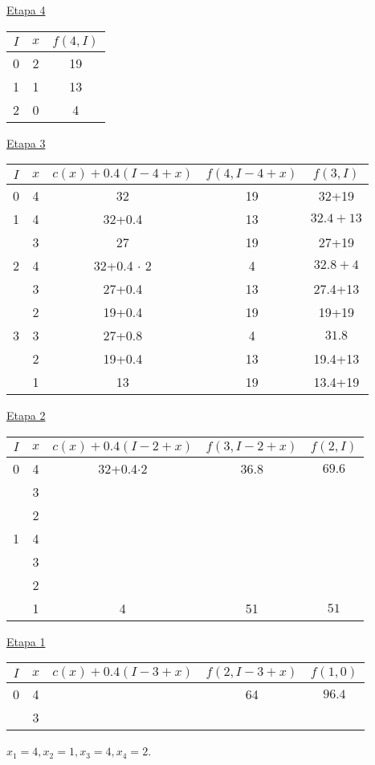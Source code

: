 \documentclass[twoside]{article}
\begin{document}
\begin{ejercicio}{3}
\begin{solucion}
\underline{Etapa 4}

\begin{tabular}{|c| c| c|}
\hline
$I$ & $x$ & $f(4,I)$\\
\hline
0 & 2 & 19\\
\hline
1 & 1 & 13\\
\hline
2 & 0 & 4\\
\hline
\end{tabular}

\underline{Etapa 3}

\begin{tabular}{|c| c| c|c|c|}
\hline
$I$ & $x$ & $c(x)+0.4(I-4+x)$ & $f(4,I-4+x)$ & $f(3,I)$\\
\hline
0 & 4 & 32 & 19 & 32+19\\
\hline
\hline
1 & 4 & 32+0.4 & 13 & $\boxed{32.4+13}$\\
\hline
 & 3 & 27 & 19 & 27+19\\
\hline
\hline
2 & 4 & 32+0.4 $\cdot$ 2 & 4 & $\boxed{32.8+4}$\\
\hline
  & 3 & 27+0.4 & 13 & 27.4+13\\
  \hline
  & 2 & 19+0.4 & 19 & 19+19\\
  \hline
  \hline
3 & 3 & 27+0.8 & 4 & $\boxed{31.8}$\\
\hline
 &  2 & 19+0.4 & 13 & 19.4+13\\
 \hline
 & 1 & 13 & 19 & 13.4+19\\
 \hline
\end{tabular}

\underline{Etapa 2}

\begin{tabular}{|c|c|c|c|c|}
\hline
$I$ & $x$ & $c(x)+0.4(I-2+x)$ & $f(3,I-2+x)$ & $f(2,I)$\\
\hline
0 & 4 & 32+0.4$\cdot$2 & 36.8 & $\boxed{69.6}$\\
  & 3 &                &       & \\
  & 2 &                &        & \\
\hline
\hline
1 & 4  &   &    & \\
  & 3 &   &     & \\
  & 2 &   &    & \\
  & 1 & 4 & 51 & $\boxed{51}$\\
  \hline
\end{tabular}

\underline{Etapa 1}

\begin{tabular}{|c|c|c|c|c|}
\hline
$I$ & $x$ & $c(x)+0.4(I-3+x)$ & $f(2,I-3+x)$ & $f(1,0)$\\
\hline
0 & 4 &  & 64 & $\boxed{96.4}$\\
  & 3 &                &       & \\
\hline
\end{tabular}

$x_1=4, x_2=1, x_3=4, x_4=2$.
\end{solucion}
\end{ejercicio}	
\end{document}

